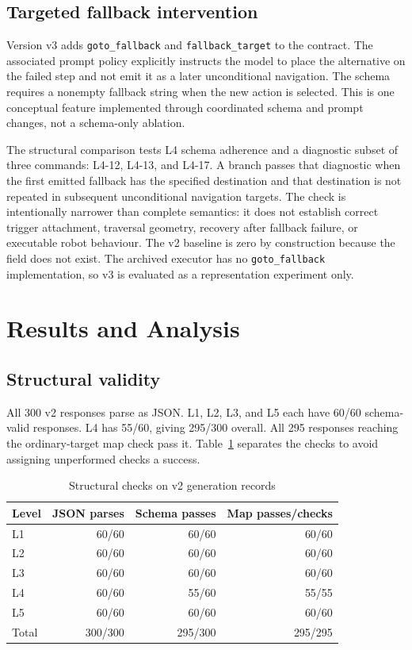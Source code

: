 \documentclass[journal]{IEEEtran}
\newcommand{\field}[1]{\texttt{#1}}
\begin{document}
\subsection{Targeted fallback intervention}
Version v3 adds \field{goto\_fallback} and \field{fallback\_target} to the contract. The associated prompt policy explicitly instructs the model to place the alternative on the failed step and not emit it as a later unconditional navigation. The schema requires a nonempty fallback string when the new action is selected. This is one conceptual feature implemented through coordinated schema and prompt changes, not a schema-only ablation.

The structural comparison tests L4 schema adherence and a diagnostic subset of three commands: L4-12, L4-13, and L4-17. A branch passes that diagnostic when the first emitted fallback has the specified destination and that destination is not repeated in subsequent unconditional navigation targets. The check is intentionally narrower than complete semantics: it does not establish correct trigger attachment, traversal geometry, recovery after fallback failure, or executable robot behaviour. The v2 baseline is zero by construction because the field does not exist. The archived executor has no \field{goto\_fallback} implementation, so v3 is evaluated as a representation experiment only.

\section{Results and Analysis}
\subsection{Structural validity}
All 300 v2 responses parse as JSON. L1, L2, L3, and L5 each have 60/60 schema-valid responses. L4 has 55/60, giving 295/300 overall. All 295 responses reaching the ordinary-target map check pass it. Table~\ref{tab:structural} separates the checks to avoid assigning unperformed checks a success.

\begin{table}[t]
\caption{Structural checks on v2 generation records}
\label{tab:structural}\centering\small
\begin{tabular}{@{}lrrr@{}}
\toprule
Level & JSON parses & Schema passes & Map passes/checks\\\midrule
L1 & 60/60 & 60/60 & 60/60\\
L2 & 60/60 & 60/60 & 60/60\\
L3 & 60/60 & 60/60 & 60/60\\
L4 & 60/60 & 55/60 & 55/55\\
L5 & 60/60 & 60/60 & 60/60\\\midrule
Total & 300/300 & 295/300 & 295/295\\
\bottomrule
\end{tabular}
\end{table}
\end{document}
